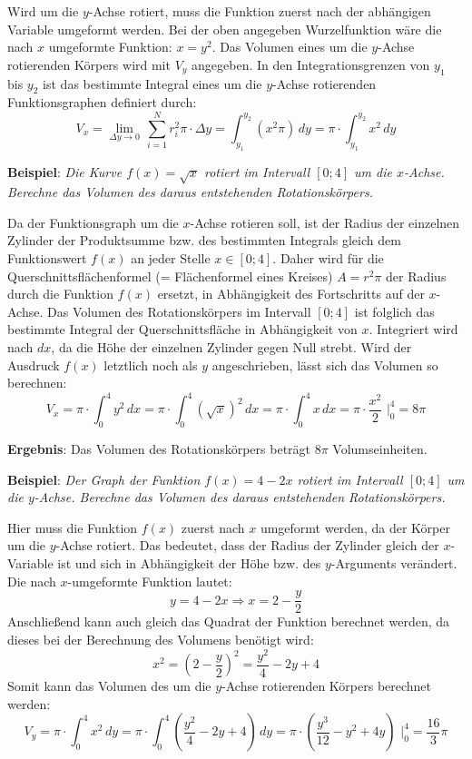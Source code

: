 Wird um die $y$-Achse rotiert, muss die Funktion zuerst nach der abh\"{a}ngigen Variable umgeformt werden. Bei der oben angegeben Wurzelfunktion w\"{a}re die nach $x$ umgeformte Funktion: $x = y^2$. Das Volumen eines um die $y$-Achse rotierenden K\"{o}rpers wird mit $V_y$ angegeben. In den Integrationsgrenzen von $y_1$ bis $y_2$ ist das bestimmte Integral eines um die $y$-Achse rotierenden Funktionsgraphen definiert durch: $$V_x = \lim_{\Delta y \rightarrow 0} \, \sum_{i=1}^{N} r_i^2 \pi \cdot \Delta y = \int_{y_1}^{y_2} (x^2 \pi) \, dy = \pi \cdot \int_{y_1}^{y_2} x^2 \, dy$$ 

\pagebreak

\textbf{Beispiel}: \emph{Die Kurve $f(x) = \sqrt{x}$ rotiert im Intervall $[0;4]$ um die $x$-Achse. Berechne das Volumen des daraus entstehenden Rotationsk\"{o}rpers.}

Da der Funktionsgraph um die $x$-Achse rotieren soll, ist der Radius der einzelnen Zylinder der Produktsumme bzw. des bestimmten Integrals gleich dem Funktionswert $f(x)$ an jeder Stelle $x \in [0 ; 4]$. Daher wird f\"{u}r die Querschnittsfl\"{a}chenformel (= Fl\"{a}chenformel eines Kreises) $A = r^2 \pi$ der Radius durch die Funktion $f(x)$ ersetzt, in Abh\"{a}ngigkeit des Fortschritts auf der $x$-Achse. Das Volumen des Rotationsk\"{o}rpers im Intervall $[0 ; 4]$ ist folglich das bestimmte Integral der Querschnittsfl\"{a}che in Abh\"{a}ngigkeit von $x$. Integriert wird nach $dx$, da die H\"{o}he der einzelnen Zylinder gegen Null strebt. Wird der Ausdruck $f(x)$ letztlich noch als $y$ angeschrieben, l\"{a}sst sich das Volumen so berechnen: $$V_x = \pi \cdot \int_0^4 y^2 \, dx = \pi \cdot \int_0^4 (\sqrt{x})^2 \, dx = \pi \cdot \int_0^4 x \, dx = \pi \cdot \frac{x^2}{2} \, \, \bigg|_0^4 = 8\pi$$

\textbf{Ergebnis}: Das Volumen des Rotationsk\"{o}rpers betr\"{a}gt $8\pi$ Volumseinheiten. 

\textbf{Beispiel}: \emph{Der Graph der Funktion $f(x) = 4 - 2x$ rotiert im Intervall $[0 ; 4]$ um die $y$-Achse. Berechne das Volumen des daraus entstehenden Rotationsk\"{o}rpers.}

Hier muss die Funktion $f(x)$ zuerst nach $x$ umgeformt werden, da der K\"{o}rper um die $y$-Achse rotiert. Das bedeutet, dass der Radius der Zylinder gleich der $x$-Variable ist und sich in Abh\"{a}ngigkeit der H\"{o}he bzw. des $y$-Arguments ver\"{a}ndert. Die nach $x$-umgeformte Funktion lautet: $$y = 4 - 2x \Rightarrow x = 2 - \frac{y}{2}$$ Anschlie\ss{}end kann auch gleich das Quadrat der Funktion berechnet werden, da dieses bei der Berechnung des Volumens ben\"{o}tigt wird: $$x^2 = \left(2 - \frac{y}{2}\right)^2 = \frac{y^2}{4} - 2y + 4$$ Somit kann das Volumen des um die $y$-Achse rotierenden K\"{o}rpers berechnet werden: $$V_y = \pi \cdot \int_0^4 x^2 \, dy = \pi \cdot \int_0^4 \left( \frac{y^2}{4} - 2y + 4 \right) \, dy = \pi \cdot \left( \frac{y^3}{12} - y^2 + 4y \right) \,\, \bigg |_0^4 = \frac{16}{3} \pi $$

